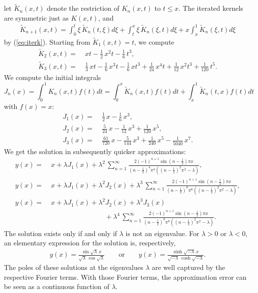 \documentclass{article}
\begin{document}
let $\widetilde{K}_n(x,t)$ denote the restriction of $K_n(x,t)$ to $t\le x$. 
The iterated kernels are symmetric just as $K(x,t)$, and
\begin{align}
\widetilde{K}_{n+1}(x,t)= %
\int_0^t \xi\,\widetilde{K}_{n}(t,\xi)d\xi+\int_t^x \xi\,\widetilde{K}_{n}(\xi,t)d\xi
+x \int_x^1 \widetilde{K}_{n}(\xi,t)d\xi
\end{align}
by (\ref{eq:iterk}). Starting from $\widetilde{K}_1(x,t)=t$, we compute
\begin{align} 
\widetilde{K}_2(x,t)= &\; \textstyle  xt-\frac12\,x^2t-\frac16\,t^3,\\
\widetilde{K}_3(x,t)= &\; \textstyle  \frac13\,xt-\frac16\,x^3t-\frac16\,xt^3
+\frac1{24}\,{x}^{4}t+\frac{1}{12}\,{x}^{2}{t}^{3}+\frac1{120}\,t^5.
\end{align}
We compute the initial integrals 
\begin{equation} 
J_n(x)=\int_0^1 K_n(x,t)f(t)dt = \int_0^x \widetilde{K}_n(x,t)f(t)dt+ \int_x^1 \widetilde{K}_n(t,x)f(t)dt
\end{equation} 
with $f(x)=x$:
\begin{align} 
J_1(x)= &\; \textstyle  \frac12\,x-\frac16\,x^3,\\
J_2(x)= &\; \textstyle  \frac5{24}\,x-\frac1{12}\,x^3+\frac1{120}\,x^5,\\
J_3(x)= &\; \textstyle  \frac{61}{720}\,x-\frac{5}{144}\,x^3+\frac1{240}\,x^5-\frac{1}{5040}\,x^7.
\end{align}
We get the solution in subsequently quicker approximations:
\begin{align}   \label{eq:approx2}
y(x)= &\; x+\lambda J_1(x)+\lambda^2\,\sum_{n=1}^{\infty} \frac{2(-1)^{n+1}\sin\!\left(n-\frac12\right)\!\pi x}
{\left(n-\frac12\right)^4\!\pi^4\left(\!\left(n-\frac12\right)^2\!\pi^2-\lambda\right)},\\
 \label{eq:approx3}
y(x)= &\; x+\lambda J_1(x)+\lambda^2J_2(x)+\lambda^3\,
\sum_{n=1}^{\infty} \frac{2(-1)^{n+1}\sin\!\left(n-\frac12\right)\!\pi x}
{\left(n-\frac12\right)^6\!\pi^6\left(\!\left(n-\frac12\right)^2\!\pi^2-\lambda\right)},\\
 \label{eq:approx4}
y(x)= &\; x+\lambda J_1(x)+\lambda^2J_2(x)+\lambda^3J_3(x) \nonumber \\
& \, \hspace{95pt} + \lambda^4\,
\sum_{n=1}^{\infty} \frac{2(-1)^{n+1}\sin\!\left(n-\frac12\right)\!\pi x}
{\left(n-\frac12\right)^8\!\pi^8\left(\!\left(n-\frac12\right)^2\!\pi^2-\lambda\right)}.
\end{align}
The solution exists only if and only if $\lambda$ is not an eigenvalue.
For $\lambda>0$ or $\lambda<0$, an elementary expression for the solution is,
respectively,
\begin{align}
y(x)=\frac{\sin \sqrt{\lambda}\,x}{\sqrt{\lambda}\,\cos\sqrt\lambda} \qquad\mbox{or}\qquad
y(x)=\frac{\sinh \sqrt{-\lambda}\,x}{\sqrt{-\lambda}\,\cosh\sqrt{-\lambda}}.
\end{align}
The poles of these solutions at the eigenvalues $\lambda$ are well captured by the respective Fourier terms.
With those Fourier terms, the approximation error can be seen as a continuous function of $\lambda$. 
\end{document}
